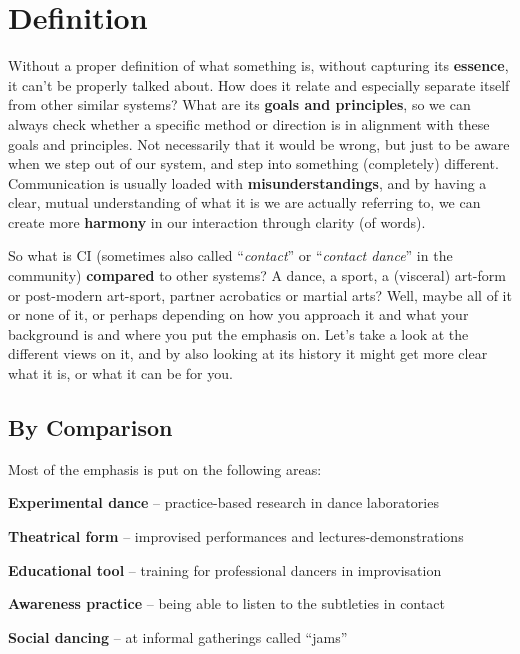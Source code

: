 \chapter{Definition}\label{ch:definition}


Without a proper definition of what something is, without capturing its \textbf{essence}, it can't be properly talked about.
How does it relate and especially separate itself from other similar systems?
What are its \textbf{goals and principles}, so we can always check whether a specific method or direction is in alignment with these goals and principles.
Not necessarily that it would be wrong, but just to be aware when we step out of our system, and step into something (completely) different.
Communication is usually loaded with \textbf{misunderstandings}, and by having a clear, mutual understanding of what it is we are actually referring to, we can create more \textbf{harmony} in our interaction through clarity (of words).

So what is CI (sometimes also called ``\textit{contact}'' or ``\textit{contact dance}'' in the community) \textbf{compared} to other systems?
A dance, a sport, a (visceral) art-form or post-modern art-sport, partner acrobatics or martial arts?
Well, maybe all of it or none of it, or perhaps depending on how you approach it and what your background is and where you put the emphasis on.
Let's take a look at the different views on it, and by also looking at its history it might get more clear what it is, or what it can be for you.

\section{By Comparison}\label{sec:by-comparison}

Most of the emphasis is put on the following areas:

\begin{itemize*}
	\item [] \textbf{Experimental dance} -- practice-based research in dance laboratories
	\item [] \textbf{Theatrical form} -- improvised performances and lectures-demonstrations
	\item [] \textbf{Educational tool} -- training for professional dancers in improvisation
	\item [] \textbf{Awareness practice} -- being able to listen to the subtleties in contact
	\item [] \textbf{Social dancing} -- at informal gatherings called ``jams''
\end{itemize*}

